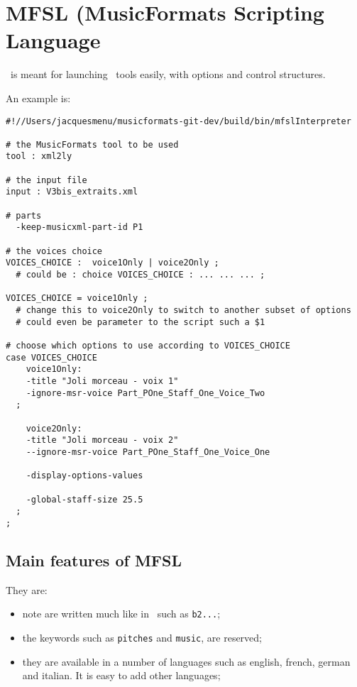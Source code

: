 
\chapter{MFSL (MusicFormats Scripting Language}


\mfslLang\ is meant for launching \mf\ tools easily, with options and control structures. 

An example is:
\begin{lstlisting}[language=MFSL]
#!//Users/jacquesmenu/musicformats-git-dev/build/bin/mfslInterpreter

# the MusicFormats tool to be used
tool : xml2ly

# the input file
input : V3bis_extraits.xml

# parts
  -keep-musicxml-part-id P1

# the voices choice
VOICES_CHOICE :  voice1Only | voice2Only ;
  # could be : choice VOICES_CHOICE : ... ... ... ;

VOICES_CHOICE = voice1Only ;
  # change this to voice2Only to switch to another subset of options
  # could even be parameter to the script such a $1

# choose which options to use according to VOICES_CHOICE
case VOICES_CHOICE
	voice1Only:
    -title "Joli morceau - voix 1"
    -ignore-msr-voice Part_POne_Staff_One_Voice_Two
  ;

	voice2Only:
    -title "Joli morceau - voix 2"
    --ignore-msr-voice Part_POne_Staff_One_Voice_One

    -display-options-values

    -global-staff-size 25.5
  ;
;
\end{lstlisting}


\section{Main features of MFSL}

They are:
\begin{itemize}
\item note are written much like in \lily\, such as {\tt b2...};
\item the keywords such as {\tt pitches} and {\tt music}, are reserved;
\item they are available in a number of languages such as english, french, german and italian. It is easy to add other languages;
\end{itemize}

